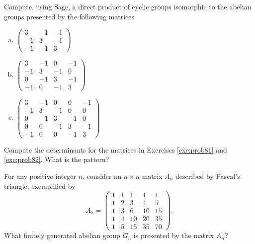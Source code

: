 \documentclass[../algebraNotesMSRI-UP2016.tex]{subfiles}
\begin{document}
\begin{frame}{}{}
\begin{exe}[cf. Problem 82]\label{exe:prob82}
Compute, using Sage, a direct product %
 of cyclic groups isomorphic to the abelian groups presented by the following matrices
\begin{enumerate}[(a)]%
\item $\begin{pmatrix}
	3 & -1 & -1 \\
	-1 & 3 & -1 \\
	-1 & -1 & 3
	\end{pmatrix}$
\item $\begin{pmatrix}
	3 & -1 & 0 & -1 \\
	-1 & 3 & -1 & 0 \\
	0 & -1 & 3 & -1 \\
	-1 & 0 & -1 & 3
	\end{pmatrix}$	
\item $\begin{pmatrix}
	3 & -1 & 0 & 0 & -1 \\
	-1 & 3 & -1 & 0 & 0 \\
	0 & -1 & 3 & -1 & 0 \\
	0 & 0 & -1 & 3 & -1 \\
	-1 & 0 & 0 & -1 & 3
	\end{pmatrix}$
\end{enumerate}
\end{exe}
\end{frame}

\begin{frame}[c]
\begin{que}
Compute the determinants for the matrices in Exercises \ref{exe:prob81} and \ref{exe:prob82}.  What is the pattern?
\end{que}
\end{frame}

\begin{frame}
\begin{exe}[cf. Problem 83]\label{exe:prob83}
For any positive integer $n$, consider an $n\times n$ matrix $A_n$ described by Pascal's triangle, exemplified by 
\[
A_5=
\begin{pmatrix}
1 & 1 & 1 & 1 & 1 \\
1 & 2 & 3 & 4 & 5 \\
1 & 3 & 6 & 10 & 15 \\
1 & 4 & 10 & 20 & 35 \\
1 & 5 & 15 & 35 & 70
\end{pmatrix}.
\]
What finitely generated abelian group $G_n$ is presented by the matrix $A_n$?
\end{exe}
\end{frame}
\end{document}
